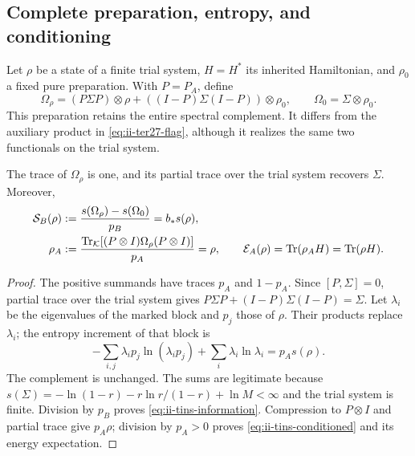 \subsection{Complete preparation, entropy, and conditioning}
\label{subsec:ii-tins-condicionamiento}

Let $\rho$ be a state of a finite trial system, $H=H^*$ its inherited
Hamiltonian, and $\rho_0$ a fixed pure preparation. With $P=P_A$, define
\begin{equation}
 \Omega_\rho=(P\Sigma P)\otimes\rho
 +((I-P)\Sigma(I-P))\otimes\rho_0,
 \qquad \Omega_0=\Sigma\otimes\rho_0.
 \label{eq:ii-tins-preparation}
\end{equation}
This preparation retains the entire spectral complement. It differs from
the auxiliary product in \eqref{eq:ii-ter27-flag}, although it realizes
the same two functionals on the trial system.

\begin{theorem}
\label{thm:ii-tins-readings}
The trace of $\Omega_\rho$ is one, and its partial trace over the trial
system recovers $\Sigma$. Moreover,
\begin{align}
 \mathcal S_B(\rho)&:=
 \frac{s(\Omega_\rho)-s(\Omega_0)}{p_B}=b_*s(\rho),
 \label{eq:ii-tins-information}\\
 \rho_A&:=\frac{\operatorname{Tr}_{\mathcal K}[(P\otimes I)\Omega_\rho(P\otimes I)]}{p_A}
 =\rho,\qquad
 \mathcal E_A(\rho)=\operatorname{Tr}(\rho_AH)=\operatorname{Tr}(\rho H).
 \label{eq:ii-tins-conditioned}
\end{align}
\end{theorem}
\begin{proof}
The positive summands have traces $p_A$ and $1-p_A$. Since
$[P,\Sigma]=0$, partial trace over the trial system gives
$P\Sigma P+(I-P)\Sigma(I-P)=\Sigma$. Let $\lambda_i$ be the eigenvalues
of the marked block and $p_j$ those of $\rho$. Their products replace
$\lambda_i$; the entropy increment of that block is
\[
 -\sum_{i,j}\lambda_ip_j\ln(\lambda_ip_j)
 +\sum_i\lambda_i\ln\lambda_i=p_As(\rho).
\]
The complement is unchanged. The sums are legitimate because
$s(\Sigma)=-\ln(1-r)-r\ln r/(1-r)+\ln M<\infty$ and the trial
system is finite. Division by $p_B$ proves
\eqref{eq:ii-tins-information}. Compression to $P\otimes I$ and partial
trace give $p_A\rho$; division by $p_A>0$ proves
\eqref{eq:ii-tins-conditioned} and its energy expectation.
\end{proof}

